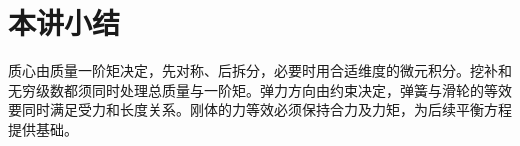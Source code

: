 \section{本讲小结}
质心由质量一阶矩决定，先对称、后拆分，必要时用合适维度的微元积分。挖补和无穷级数都须同时处理总质量与一阶矩。弹力方向由约束决定，弹簧与滑轮的等效要同时满足受力和长度关系。刚体的力等效必须保持合力及力矩，为后续平衡方程提供基础。

